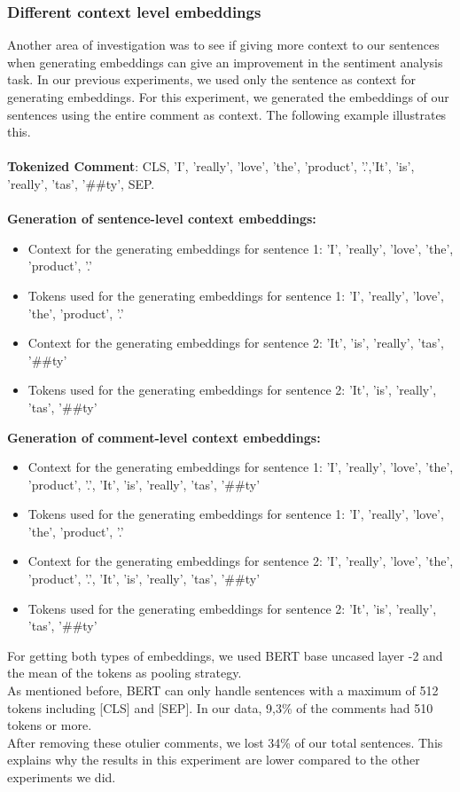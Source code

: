 \subsubsection{Different context level embeddings}
\label{sentenceCommentLevelContextExperiment}
Another area of investigation was to see if giving more context to our sentences when generating embeddings can give an improvement in the sentiment analysis task.
In our previous experiments, we used only the sentence as context for generating embeddings. For this experiment, we generated the embeddings of our sentences using the entire comment as context.
The following example illustrates this.\\\\
{\bf Tokenized Comment}: CLS, {\color{TUMBlau}'I', 'really', 'love', 'the', 'product', '.'},{\color{red}'It', 'is', 'really', 'tas', '\#\#ty'}, SEP.\\\\
{\bf Generation of sentence-level context embeddings:}
\begin{itemize}
  \item Context for the generating embeddings for {\color{TUMBlau} sentence 1}: 'I', 'really', 'love', 'the', 'product', '.'
  \item Tokens used for the generating embeddings for {\color{TUMBlau} sentence 1}: 'I', 'really', 'love', 'the', 'product', '.'
  \item Context for the generating embeddings for {\color{red} sentence 2}: 'It', 'is', 'really', 'tas', '\#\#ty'
  \item Tokens used for the generating embeddings for {\color{red} sentence 2}: 'It', 'is', 'really', 'tas', '\#\#ty'
\end{itemize}
{\bf Generation of comment-level context embeddings:}
\begin{itemize}
  \item Context for the generating embeddings for {\color{TUMBlau} sentence 1}: 'I', 'really', 'love', 'the', 'product', '.', 'It', 'is', 'really', 'tas', '\#\#ty'
  \item Tokens used for the generating embeddings for {\color{TUMBlau} sentence 1}: 'I', 'really', 'love', 'the', 'product', '.'
  \item Context for the generating embeddings for {\color{red} sentence 2}: 'I', 'really', 'love', 'the', 'product', '.', 'It', 'is', 'really', 'tas', '\#\#ty'
  \item Tokens used for the generating embeddings for {\color{red} sentence 2}: 'It', 'is', 'really', 'tas', '\#\#ty'
\end{itemize}
For getting both types of embeddings, we used BERT base uncased layer -2 and the mean of the tokens as pooling strategy.\\
As mentioned before, BERT can only handle sentences with a maximum of 512 tokens including [CLS] and [SEP]. In our data, 9,3\% of the comments had 510 tokens or more.\\
After removing these otulier comments, we lost 34\% of our total sentences. This explains why the results in this experiment are lower compared to the other experiments we did.
